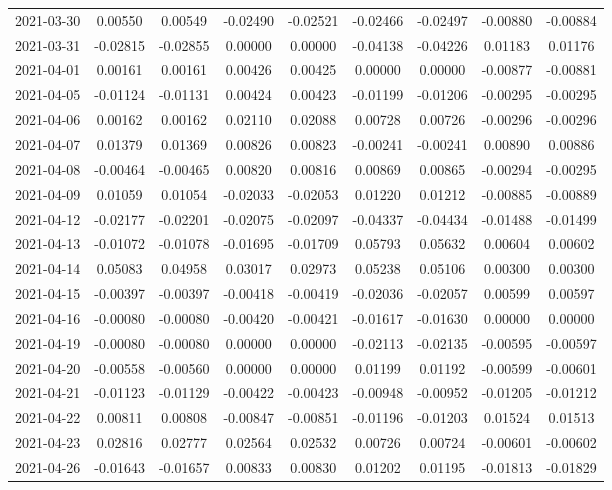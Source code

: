 {\begin{footnotesize}
\begin{longtable}{lcccccccc}
2021-03-30 & 0.00550 & 0.00549 & -0.02490 & -0.02521 & -0.02466 & -0.02497 & -0.00880 & -0.00884 \\
2021-03-31 & -0.02815 & -0.02855 & 0.00000 & 0.00000 & -0.04138 & -0.04226 & 0.01183 & 0.01176 \\
2021-04-01 & 0.00161 & 0.00161 & 0.00426 & 0.00425 & 0.00000 & 0.00000 & -0.00877 & -0.00881 \\
2021-04-05 & -0.01124 & -0.01131 & 0.00424 & 0.00423 & -0.01199 & -0.01206 & -0.00295 & -0.00295 \\
2021-04-06 & 0.00162 & 0.00162 & 0.02110 & 0.02088 & 0.00728 & 0.00726 & -0.00296 & -0.00296 \\
2021-04-07 & 0.01379 & 0.01369 & 0.00826 & 0.00823 & -0.00241 & -0.00241 & 0.00890 & 0.00886 \\
2021-04-08 & -0.00464 & -0.00465 & 0.00820 & 0.00816 & 0.00869 & 0.00865 & -0.00294 & -0.00295 \\
2021-04-09 & 0.01059 & 0.01054 & -0.02033 & -0.02053 & 0.01220 & 0.01212 & -0.00885 & -0.00889 \\
2021-04-12 & -0.02177 & -0.02201 & -0.02075 & -0.02097 & -0.04337 & -0.04434 & -0.01488 & -0.01499 \\
2021-04-13 & -0.01072 & -0.01078 & -0.01695 & -0.01709 & 0.05793 & 0.05632 & 0.00604 & 0.00602 \\
2021-04-14 & 0.05083 & 0.04958 & 0.03017 & 0.02973 & 0.05238 & 0.05106 & 0.00300 & 0.00300 \\
2021-04-15 & -0.00397 & -0.00397 & -0.00418 & -0.00419 & -0.02036 & -0.02057 & 0.00599 & 0.00597 \\
2021-04-16 & -0.00080 & -0.00080 & -0.00420 & -0.00421 & -0.01617 & -0.01630 & 0.00000 & 0.00000 \\
2021-04-19 & -0.00080 & -0.00080 & 0.00000 & 0.00000 & -0.02113 & -0.02135 & -0.00595 & -0.00597 \\
2021-04-20 & -0.00558 & -0.00560 & 0.00000 & 0.00000 & 0.01199 & 0.01192 & -0.00599 & -0.00601 \\
2021-04-21 & -0.01123 & -0.01129 & -0.00422 & -0.00423 & -0.00948 & -0.00952 & -0.01205 & -0.01212 \\
2021-04-22 & 0.00811 & 0.00808 & -0.00847 & -0.00851 & -0.01196 & -0.01203 & 0.01524 & 0.01513 \\
2021-04-23 & 0.02816 & 0.02777 & 0.02564 & 0.02532 & 0.00726 & 0.00724 & -0.00601 & -0.00602 \\
2021-04-26 & -0.01643 & -0.01657 & 0.00833 & 0.00830 & 0.01202 & 0.01195 & -0.01813 & -0.01829 \\

\end{longtable}
\end{footnotesize}}
